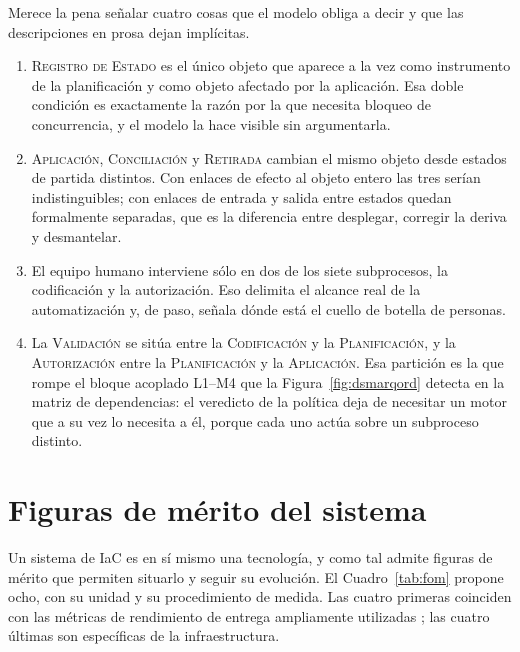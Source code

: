 \documentclass[11pt,letterpaper]{article}
\begin{document}
Merece la pena señalar cuatro cosas que el modelo obliga a decir y que las
descripciones en prosa dejan implícitas.

\begin{enumerate}
  \item \textsc{Registro de Estado} es el único objeto que aparece a la vez
    como instrumento de la planificación y como objeto afectado por la
    aplicación. Esa doble condición es exactamente la razón por la que
    necesita bloqueo de concurrencia, y el modelo la hace visible sin
    argumentarla.
  \item \textsc{Aplicación}, \textsc{Conciliación} y \textsc{Retirada} cambian
    el mismo objeto desde estados de partida distintos. Con enlaces de efecto
    al objeto entero las tres serían indistinguibles; con enlaces de entrada y
    salida entre estados quedan formalmente separadas, que es la diferencia
    entre desplegar, corregir la deriva y desmantelar.
  \item El equipo humano interviene sólo en dos de los siete subprocesos, la
    codificación y la autorización. Eso delimita el alcance real de la
    automatización y, de paso, señala dónde está el cuello de botella de
    personas.
  \item La \textsc{Validación} se sitúa entre la \textsc{Codificación} y la
    \textsc{Planificación}, y la \textsc{Autorización} entre la
    \textsc{Planificación} y la \textsc{Aplicación}. Esa partición es la que
    rompe el bloque acoplado L1--M4 que la
    Figura~\ref{fig:dsmarqord} detecta en la matriz de dependencias: el
    veredicto de la política deja de necesitar un motor que a su vez lo
    necesita a él, porque cada uno actúa sobre un subproceso distinto.
\end{enumerate}

\section{Figuras de mérito del sistema}
\label{sec:fom}

Un sistema de IaC es en sí mismo una tecnología, y como tal admite figuras de
mérito que permiten situarlo y seguir su evolución. El
Cuadro~\ref{tab:fom} propone ocho, con su unidad y su procedimiento de
medida. Las cuatro primeras coinciden con las métricas de rendimiento de
entrega ampliamente utilizadas \parencite{forsgren2018}; las cuatro últimas
son específicas de la infraestructura.
\end{document}
